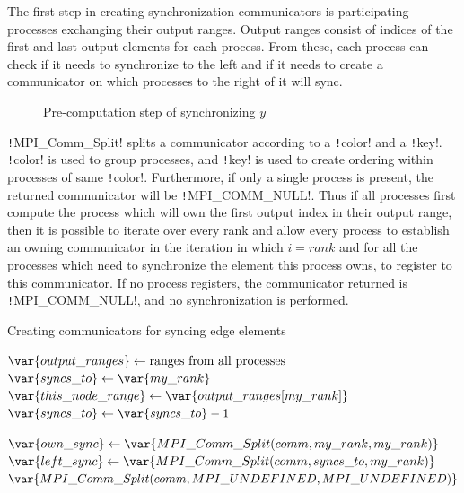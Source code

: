 \documentclass[thesis=M,english]{FITthesis}[2019/12/23]
\newcommand{\csre}[1]{\texttt!#1!}
\begin{document}
The first step in creating synchronization communicators is participating processes exchanging their output ranges.
Output ranges consist of indices of the first and last output elements for each process. From
these, each process can check if it needs to synchronize to the left and if it needs to
create a communicator on which processes to the right of it will sync.

\begin{figure}[htp]
    \centering
    \caption{Pre-computation step of synchronizing \(y\)}
\end{figure}

\csre{MPI_Comm_Split} splits a communicator according to a \csre{color} and a \csre{key}.
\csre{color} is used to group processes, and \csre{key} is used to create ordering within processes
of same \csre{color}. Furthermore, if only a single process is present, the
returned communicator will be \csre{MPI_COMM_NULL}. Thus if all processes first compute the
process which will own the first output index in their output range, then it is possible
to iterate over every rank and allow every process to establish an owning communicator
in the iteration in which \(i = rank\) and for all the processes which need to synchronize
the element this process owns, to register to this communicator. If no process registers,
the communicator returned is \csre{MPI_COMM_NULL}, and no synchronization is performed.

\begin{algorithm}[htp]
    \caption{Creating communicators for syncing edge elements}
    \begin{algorithmic}
        \State $\var{output\_ranges} \gets \text{ranges from all processes}$
        \State $\var{syncs\_to} \gets \var{my\_rank}$
        \State $\var{this\_node\_range} \gets \var{output\_ranges[my\_rank]}$
        \State $\var{syncs\_to} \gets \var{syncs\_to} - 1$
        \EndWhile

        \State $\var{own\_sync} \gets \var{MPI\_Comm\_Split(comm, my\_rank, my\_rank)}$
        \State $\var{left\_sync} \gets \var{MPI\_Comm\_Split(comm, syncs\_to, my\_rank)}$
        \Else {}
        \State $\var{MPI\_Comm\_Split(comm, MPI\_UNDEFINED, MPI\_UNDEFINED)}$
        \EndIf
        \EndFor
        \EndFunction
    \end{algorithmic}
\end{algorithm}
\end{document}
